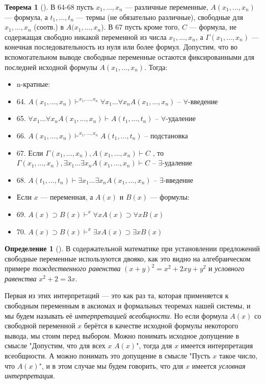 \documentclass[a4paper, 12pt]{article}  %
\theoremstyle{definition}
\newtheorem{theorem}{Теорема}
\newtheorem*{definition}{Определение}
\begin{document}
	\begin{theorem}[]
		В 64-68 пусть $x_1, \dots, x_n$ --- различные переменные, $A(x_1, \dots, x_n)$ --- формула, а
		$t_1, \dots, t_n$ --- термы (не обязательно различные), свободные для $x_1, \dots, x_n$
		(соотв.) в $A(x_1, \dots, x_n$). В 67 пусть кроме того, $C$ --- формула, не содержащая
		свободно никакой переменной из числа $x_1, \dots, x_n$, а $\Gamma (x_1, \dots, x_n)$ ---
		конечная последовательность из нуля или более формул. Допустим, что во вспомогательном выводе
		свободные переменные остаются фиксированными для последней исходной формулы 
		$A(x_1, \dots, x_n)$. Тогда:
		\begin{itemize}[label={}]
			\setlength\itemsep{0pt}
			
			\item n-кратные:
			\item 64. $A(x_1, \dots, x_n) \vdash^{x_1, \dots, x_n} \forall x_1 \dots \forall x_n A(x_1, \dots, x_n)$ -- $\forall$-введение 
			\item 65. $\forall x_1 \dots \forall x_n A(x_1, \dots, x_n) \vdash A(t_1, \dots, t_n)$ -- $\forall$-удаление
			\item 66. $A(x_1, \dots, x_n) \vdash^{x_1, \dots, x_n} A(t_1, \dots, t_n)$ -- подстановка 
			\item 67. Если $\Gamma(x_1, \dots, x_n), A(x_1, \dots, x_n) \vdash C$ , то $\Gamma(x_1, \dots, x_n), \exists x_1 \dots \exists x_n A(x_1, \dots, x_n) \vdash C$ --  $\exists$-удаление
			\item 68. $A(t_1, \dots, t_n) \vdash \exists x_1 \dots \exists x_n A(x_1, \dots, x_n)$ -- $\exists$-введение
			\item Если $x$ --- переменная, а $A(x)$ и $B(x)$ --- формулы:
			\item 69. $A(x) \supset B(x) \vdash^x \forall x A(x) \supset \forall x B(x)$
			\item 70. $A(x) \supset B(x) \vdash^x \exists x A(x) \supset \exists x B(x)$
		\end{itemize}
	\end{theorem}

	\begin{definition}[]
		В содержательной математике при установлении предложений свободные переменные используются
		двояко, как это видно на алгебраическом примере \textit{тождественного равенства}
		$(x + y)^2 = x^2 + 2xy + y^2$ и \textit{условного равенства} $x^2 + 2 = 3x$.
		
		Первая из этих интерпретаций --- это как раз та, которая применяется к свободным переменным в
		аксиомах и формальных теоремах нашей системы, и мы будем называть её 
		\textit{интерпретацией всеобщности}. Но если формула $A(x)$ со свободной переменной $x$
		берётся в качестве исходной формулы некоторого вывода, мы стоим перед выбором. Можно понимать
		исходное допущение в смысле "Допустим, что для всех $x$ $A(x)$", тогда для $x$ имеется
		интерпретация всеобщности. А можно понимать это допущение в смысле "Пусть $x$ такое число,
		что $A(x)$", и в этом случае мы будем говорить, что для $x$ имеется
		\textit{условная интерпретация}.		
	\end{definition}
\end{document}
